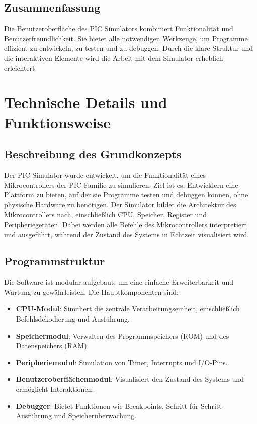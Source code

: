 \documentclass[a4paper,11pt]{report}
\begin{document}
\section{Zusammenfassung}
Die Benutzeroberfläche des PIC Simulators kombiniert Funktionalität und Benutzerfreundlichkeit. Sie bietet alle notwendigen Werkzeuge, um Programme effizient zu entwickeln, zu testen und zu debuggen. Durch die klare Struktur und die interaktiven Elemente wird die Arbeit mit dem Simulator erheblich erleichtert.

\chapter{Technische Details und Funktionsweise}

\section{Beschreibung des Grundkonzepts}
Der PIC Simulator wurde entwickelt, um die Funktionalität eines Mikrocontrollers der PIC-Familie zu simulieren. Ziel ist es, Entwicklern eine Plattform zu bieten, auf der sie Programme testen und debuggen können, ohne physische Hardware zu benötigen. Der Simulator bildet die Architektur des Mikrocontrollers nach, einschließlich CPU, Speicher, Register und Peripheriegeräten. Dabei werden alle Befehle des Mikrocontrollers interpretiert und ausgeführt, während der Zustand des Systems in Echtzeit visualisiert wird.

\section{Programmstruktur}
Die Software ist modular aufgebaut, um eine einfache Erweiterbarkeit und Wartung zu gewährleisten. Die Hauptkomponenten sind:
\begin{itemize}
    \item \textbf{CPU-Modul}: Simuliert die zentrale Verarbeitungseinheit, einschließlich Befehlsdekodierung und Ausführung.
    \item \textbf{Speichermodul}: Verwalten des Programmspeichers (ROM) und des Datenspeichers (RAM).
    \item \textbf{Peripheriemodul}: Simulation von Timer, Interrupts und I/O-Pins.
    \item \textbf{Benutzeroberflächenmodul}: Visualisiert den Zustand des Systems und ermöglicht Interaktionen.
    \item \textbf{Debugger}: Bietet Funktionen wie Breakpoints, Schritt-für-Schritt-Ausführung und Speicherüberwachung.
\end{itemize}
\end{document}
